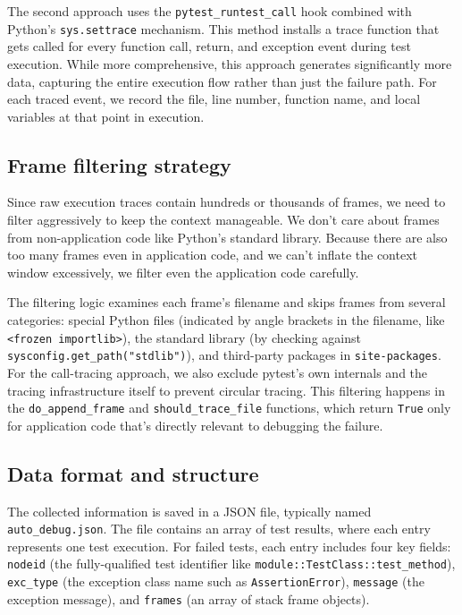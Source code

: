 The second approach uses the \texttt{pytest\_runtest\_call} hook combined with Python's \texttt{sys.settrace} mechanism. This method installs a trace function that gets called for every function call, return, and exception event during test execution. While more comprehensive, this approach generates significantly more data, capturing the entire execution flow rather than just the failure path. For each traced event, we record the file, line number, function name, and local variables at that point in execution.

\subsection{Frame filtering strategy}

Since raw execution traces contain hundreds or thousands of frames, we need to filter aggressively to keep the context manageable. We don't care about frames from non-application code like Python's standard library. Because there are also too many frames even in application code, and we can't inflate the context window excessively, we filter even the application code carefully.

The filtering logic examines each frame's filename and skips frames from several categories: special Python files (indicated by angle brackets in the filename, like \texttt{<frozen importlib>}), the standard library (by checking against \texttt{sysconfig.get\_path("stdlib")}), and third-party packages in \texttt{site-packages}. For the call-tracing approach, we also exclude pytest's own internals and the tracing infrastructure itself to prevent circular tracing. This filtering happens in the \texttt{do\_append\_frame} and \texttt{should\_trace\_file} functions, which return \texttt{True} only for application code that's directly relevant to debugging the failure.


\subsection{Data format and structure}

The collected information is saved in a JSON file, typically named \texttt{auto\_debug.json}. The file contains an array of test results, where each entry represents one test execution. For failed tests, each entry includes four key fields: \texttt{nodeid} (the fully-qualified test identifier like \texttt{module::TestClass::test\_method}), \texttt{exc\_type} (the exception class name such as \texttt{AssertionError}), \texttt{message} (the exception message), and \texttt{frames} (an array of stack frame objects).

